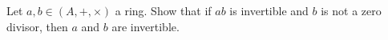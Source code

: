 Let $a, b \in (A, +, \times)$ a ring. Show that if $ab$ is invertible and $b$ is not a zero divisor, then $a$ and $b$ are invertible.